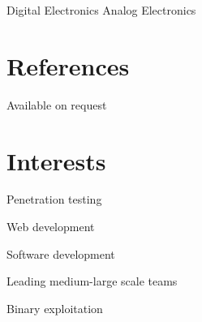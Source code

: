 \documentclass[letterpaper]{deedy-resume} %
\begin{document}
\begin{minipage}[t]{0.33\textwidth}
\textbullet{} Digital Electronics \textbullet{} Analog Electronics 

\sectionspace %

\section{References}

Available on request

\sectionspace %

\section{Interests}
\vspace{\topsep}
\vspace{\topsep} %
\begin{tightitemize}
\item Penetration testing
\item Web development
\item Software development
\item Leading medium-large scale teams
\item Binary exploitation
\end{tightitemize}


%
%
%
%


\end{minipage} %
\hfill
%
%
\end{document}
